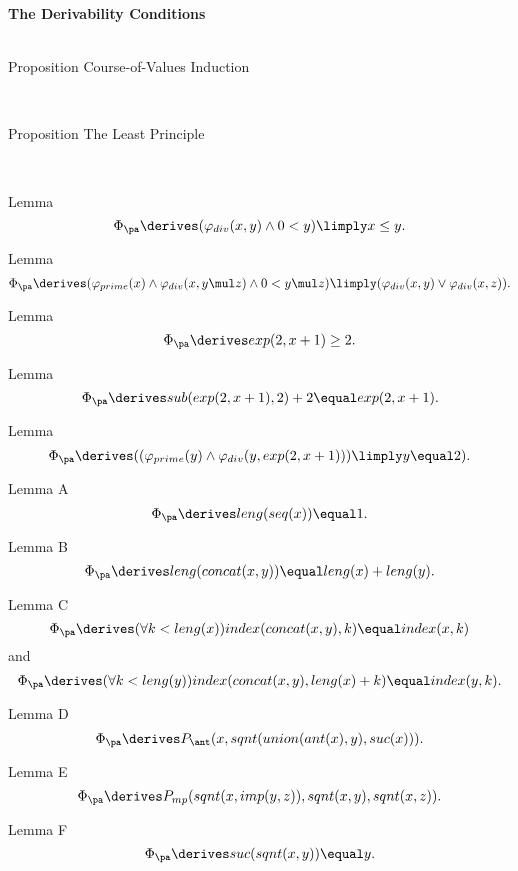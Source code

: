\textbf{\Large The Derivability Conditions}
\ \\
\ \\
\begin{theorem}{Proposition}
Course-of-Values Induction
\end{theorem}\\
\begin{theorem}{Proposition}
The Least Principle
\end{theorem}\\
\begin{theorem}{Lemma}
\[
\Phi_\pa \derives (\varphi_{div}(x, y) \land 0 < y) \limply x \leq y.
\]
\end{theorem}
\begin{theorem}{Lemma}
\[
\Phi_\pa \derives (\varphi_{prime}(x) \land \varphi_{div}(x, y \mul z) \land 0 < y \mul z) \limply (\varphi_{div}(x, y) \lor \varphi_{div}(x, z)).
\]
\end{theorem}
\begin{theorem}{Lemma}
\[
\Phi_\pa \derives exp(2, x + 1) \geq 2.
\]
\end{theorem}
\begin{theorem}{Lemma}
\[
\Phi_\pa \derives sub(exp(2, x + 1), 2) + 2 \equal exp(2, x + 1).
\]
\end{theorem}
\begin{theorem}{Lemma}
\[
\Phi_\pa \derives ((\varphi_{prime}(y) \land \varphi_{div}(y, exp(2, x + 1))) \limply y \equal 2).
\]
\end{theorem}
\begin{theorem}{Lemma A}
\[
\Phi_\pa \derives leng(seq(x)) \equal 1.
\]
\end{theorem}
\begin{theorem}{Lemma B}
\[
\Phi_\pa \derives leng(concat(x, y)) \equal leng(x) + leng(y).
\]
\end{theorem}
\begin{theorem}{Lemma C}
\[
\Phi_\pa \derives (\forall k < leng(x))index(concat(x, y), k) \equal index(x, k)
\]
and
\[
\Phi_\pa \derives (\forall k < leng(y))index(concat(x, y), leng(x) + k) \equal index(y, k).
\]
\end{theorem}
\begin{theorem}{Lemma D}
\[
\Phi_\pa \derives P_\ant(x, sqnt(union(ant(x), y), suc(x))).
\]
\end{theorem}
\begin{theorem}{Lemma E}
\[
\Phi_\pa \derives P_{mp}(sqnt(x, imp(y, z)), sqnt(x, y), sqnt(x, z)).
\]
\end{theorem}
\begin{theorem}{Lemma F}
\[
\Phi_\pa \derives suc(sqnt(x, y)) \equal y.
\]
\end{theorem}
